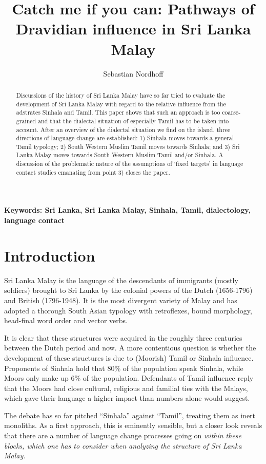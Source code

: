 \documentclass{article}
\title{Catch me if you can: Pathways of Dravidian influence in Sri Lanka Malay}
\author{Sebastian Nordhoff}
\begin{document}
\maketitle
 
\begin{abstract}
 Discussions of the history of Sri Lanka Malay have so far tried to evaluate  the development of   Sri Lanka Malay with regard to the relative influence from the adstrates Sinhala and Tamil. This paper shows that such an approach is too coarse-grained and that the dialectal situation of especially Tamil has to be taken into account. After an overview of the dialectal situation we find on the island, three directions of language change are established: 1) Sinhala moves towards a general Tamil typology; 2) South Western Muslim Tamil moves towards Sinhala; and 3) Sri Lanka Malay moves towards South Western Muslim Tamil and/or Sinhala. A discussion of the  problematic nature of the assumptions of `fixed targets' in language contact studies emanating from point 3) closes the paper. 
\end{abstract}

\textbf{Keywords: Sri Lanka, Sri Lanka Malay, Sinhala, Tamil, dialectology, language contact}

\section{Introduction}
Sri Lanka Malay is the language of the descendants of immigrants (mostly soldiers) brought to Sri Lanka by the colonial powers of the Dutch (1656-1796) and British (1796-1948). It is the most divergent variety of Malay and has adopted a thorough South Asian typology with retroflexes, bound morphology, head-final word order and vector verbs. 

It is clear that these structures were acquired in the roughly three centuries  between the Dutch period and now. A more contentious question is whether the development of these structures is due to (Moorish) Tamil or Sinhala influence. Proponents of Sinhala hold that 80\% of the population speak Sinhala, while Moors only make up 6\% of the population. Defendants of Tamil influence reply that the Moors had close cultural, religious and familial ties with the Malays, which gave their language a higher impact than numbers alone would suggest. 

The debate has so far pitched ``Sinhala'' against ``Tamil'', treating them as inert monoliths. As a first approach, this is eminently sensible, but a closer look reveals that there are a number of language change processes going on \em within \em these blocks, which one has to consider when analyzing the structure of Sri Lanka Malay.
\end{document}
